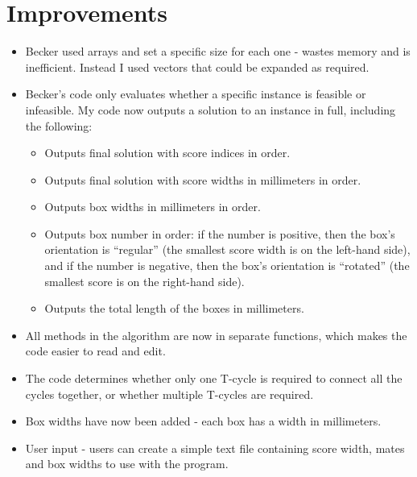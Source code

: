 \documentclass[a4paper, 11pt, twoside, onecolumn, openany]{article}
\begin{document}
\section{Improvements}
\begin{itemize}
	\item Becker used arrays and set a specific size for each one - wastes memory and is inefficient. Instead I used vectors that could be expanded as required.
	\item Becker's code only evaluates whether a specific instance is feasible or infeasible. My code now outputs a solution to an instance in full, including the following:
	\begin{itemize}
		\item Outputs final solution with score indices in order.
		\item Outputs final solution with score widths in millimeters in order.
		\item Outputs box widths in millimeters in order.
		\item Outputs box number in order: if the number is positive, then the box's orientation is ``regular'' (the smallest score width is on the left-hand side), and if the number is negative, then the box's orientation is ``rotated'' (the smallest score is on the right-hand side).
		\item Outputs the total length of the boxes in millimeters.
	\end{itemize}
	\item All methods in the algorithm are now in separate functions, which makes the code easier to read and edit.
	\item The code determines whether only one T-cycle is required to connect all the cycles together, or whether multiple T-cycles are required. 
	\item Box widths have now been added - each box has a width in millimeters.
	\item User input - users can create a simple text file containing score width, mates and box widths to use with the program.
	
	
	
\end{itemize}


\begin{comment}
\begin{table}[!htb]
\centering
\begin{tabular}{|c|c|}
\hline
\multicolumn{2}{|c|}{Match}\\ \hline
0 & 19 \\ \hline
1 & 18 \\ \hline
2 & 17 \\ \hline
3 & 16 \\ \hline
4 & 15 \\ \hline
5 & 14 \\ \hline
6 & 13 \\ \hline
7 & 11 \\ \hline
8 & 12 \\ \hline
9 & 10 \\
\hline
\end{tabular}
\caption{Match List.}
\end{table}	
\end{comment}
\end{document}
